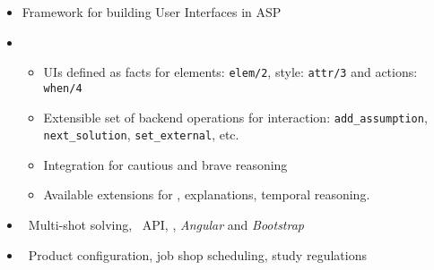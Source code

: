 \begin{frame}{\clinguin}
  \begin{itemize}
    \item {} Framework for building User Interfaces in ASP
    \item {} 
      \begin{itemize}
      \item UIs defined as facts for elements: \texttt{elem/2}, style: \texttt{attr/3} and actions: \texttt{when/4}
      \item Extensible set of backend operations for interaction: \texttt{add\_assumption}, \texttt{next\_solution}, \texttt{set\_external}, etc.
      \item Integration for cautious and brave reasoning
      \item Available extensions for \clingraph, explanations, temporal reasoning.
      \end{itemize}
    \item {} \  Multi-shot solving, \clingo\ API, \clorm, \textit{Angular} and \textit{Bootstrap}
    \item {} \ Product configuration, job shop scheduling, study regulations
  \end{itemize}
\end{frame}
%

